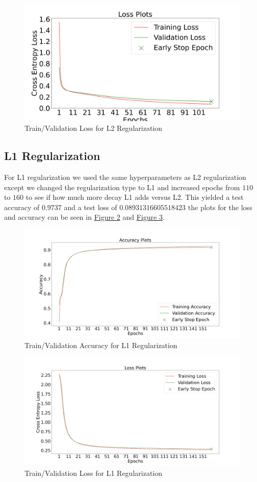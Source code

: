 \documentclass{article}
\begin{document}
\begin{figure}[h]
  \centering
  \includegraphics[width=0.8\linewidth]{include/reg-exp-l2-loss.png}
  \caption{Train/Validation Loss for L2 Regularization}
  \label{fig:l2_loss}
\end{figure}


\subsection{L1 Regularization}
For L1 regularization we used the same hyperparameters as L2 regularization
except we changed the regularization type to L1 and increased 
epochs from $110$ to $160$ to see if how much more decay L1 adds versus
L2. This yielded a test accuracy of
$0.9737$ and a test loss of $0.08931316605518423$ the plots for the loss and accuracy
can be seen in \hyperref[fig:l1_acc]{Figure \ref{fig:l1_acc}} and
\hyperref[fig:l1_loss]{Figure \ref{fig:l1_loss}}.

\begin{figure}[h]
  \centering
  \includegraphics[width=0.8\linewidth]{include/reg-exp-l1-acc.png}
  \caption{Train/Validation Accuracy for L1 Regularization}
  \label{fig:l1_acc}
\end{figure}

\begin{figure}[h]
  \centering
  \includegraphics[width=0.8\linewidth]{include/reg-exp-l1-loss.png}
  \caption{Train/Validation Loss for L1 Regularization}
  \label{fig:l1_loss}
\end{figure}
\end{document}

